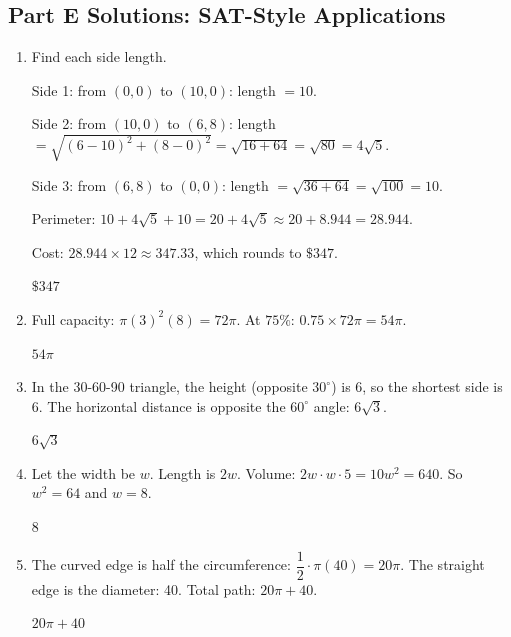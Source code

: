 \documentclass[14pt]{extarticle}
\begin{document}
\subsection*{Part E Solutions: SAT-Style Applications}
\begin{enumerate}
  \item Find each side length.

  Side 1: from \((0,0)\) to \((10,0)\): length \(= 10\).

  Side 2: from \((10,0)\) to \((6,8)\): length \(= \sqrt{(6-10)^2 + (8-0)^2} = \sqrt{16 + 64} = \sqrt{80} = 4\sqrt{5}\).

  Side 3: from \((6,8)\) to \((0,0)\): length \(= \sqrt{36 + 64} = \sqrt{100} = 10\).

  Perimeter: \(10 + 4\sqrt{5} + 10 = 20 + 4\sqrt{5} \approx 20 + 8.944 = 28.944\).

  Cost: \(28.944 \times 12 \approx 347.33\), which rounds to \(\$347\).

  \(\boxed{\$347}\)

  \item Full capacity: \(\pi(3)^2(8) = 72\pi\). At \(75\%\): \(0.75 \times 72\pi = 54\pi\).

  \(\boxed{54\pi}\)

  \item In the 30-60-90 triangle, the height (opposite \(30^\circ\)) is 6, so the shortest side is 6. The horizontal distance is opposite the \(60^\circ\) angle: \(6\sqrt{3}\).

  \(\boxed{6\sqrt{3}}\)

  \item Let the width be \(w\). Length is \(2w\). Volume: \(2w \cdot w \cdot 5 = 10w^2 = 640\). So \(w^2 = 64\) and \(w = 8\).

  \(\boxed{8}\)

  \item The curved edge is half the circumference: \(\dfrac{1}{2} \cdot \pi(40) = 20\pi\). The straight edge is the diameter: 40. Total path: \(20\pi + 40\).

  \(\boxed{20\pi + 40}\)
\end{enumerate}

\end{document}
